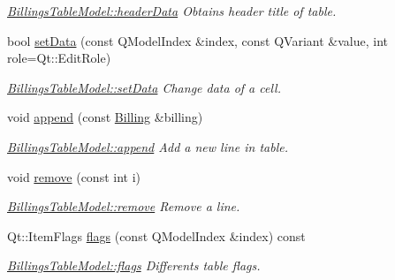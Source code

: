 \begin{DoxyCompactItemize}
\begin{DoxyCompactList}\small\item\em \hyperlink{classGui_1_1Widgets_1_1WdgModels_1_1BillingsTableModel_af441051dcb0c702ca9d390405bd8bbc9}{Billings\+Table\+Model\+::header\+Data} Obtains header title of table. \end{DoxyCompactList}\item 
bool \hyperlink{classGui_1_1Widgets_1_1WdgModels_1_1BillingsTableModel_a5df8b1b23dbd38d2244cabf91e481fd5}{set\+Data} (const Q\+Model\+Index \&index, const Q\+Variant \&value, int role=Qt\+::\+Edit\+Role)
\begin{DoxyCompactList}\small\item\em \hyperlink{classGui_1_1Widgets_1_1WdgModels_1_1BillingsTableModel_a5df8b1b23dbd38d2244cabf91e481fd5}{Billings\+Table\+Model\+::set\+Data} Change data of a cell. \end{DoxyCompactList}\item 
void \hyperlink{classGui_1_1Widgets_1_1WdgModels_1_1BillingsTableModel_aff58949de7e18482ad09bf2635e1997c}{append} (const \hyperlink{classModels_1_1Billing}{Billing} \&billing)
\begin{DoxyCompactList}\small\item\em \hyperlink{classGui_1_1Widgets_1_1WdgModels_1_1BillingsTableModel_aff58949de7e18482ad09bf2635e1997c}{Billings\+Table\+Model\+::append} Add a new line in table. \end{DoxyCompactList}\item 
void \hyperlink{classGui_1_1Widgets_1_1WdgModels_1_1BillingsTableModel_a0946d335077398f9c35f554340139ba6}{remove} (const int i)
\begin{DoxyCompactList}\small\item\em \hyperlink{classGui_1_1Widgets_1_1WdgModels_1_1BillingsTableModel_a0946d335077398f9c35f554340139ba6}{Billings\+Table\+Model\+::remove} Remove a line. \end{DoxyCompactList}\item 
Qt\+::\+Item\+Flags \hyperlink{classGui_1_1Widgets_1_1WdgModels_1_1BillingsTableModel_ab130d7853a7db8df5d57efc9a2854a4d}{flags} (const Q\+Model\+Index \&index) const 
\begin{DoxyCompactList}\small\item\em \hyperlink{classGui_1_1Widgets_1_1WdgModels_1_1BillingsTableModel_ab130d7853a7db8df5d57efc9a2854a4d}{Billings\+Table\+Model\+::flags} Differents table flags. \end{DoxyCompactList}\item 

\end{DoxyCompactItemize}
